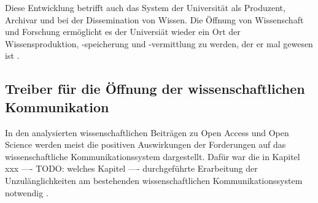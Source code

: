 Diese Entwicklung betrifft auch das System der Universität als Produzent, Archivar und bei der Dissemination von Wissen. Die Öffnung von Wissenschaft und Forschung ermöglicht es der Universiät wieder ein Ort der Wissensproduktion, -speicherung und -vermittlung zu werden, der er mal gewesen ist \cite{kittler_2004}.

\subsection{Treiber für die Öffnung der wissenschaftlichen Kommunikation}

In den analysierten wissenschaftlichen Beiträgen zu Open Access und Open Science werden meist die positiven Auswirkungen der Forderungen auf das wissenschaftliche Kommunikationssystem dargestellt. Dafür war die in Kapitel xxx ---- TODO: welches Kapitel ----  durchgeführte Erarbeitung der Unzulänglichkeiten am bestehenden wissenschaftlichen Kommunikationssystem notwendig \cite{cite:17}.

